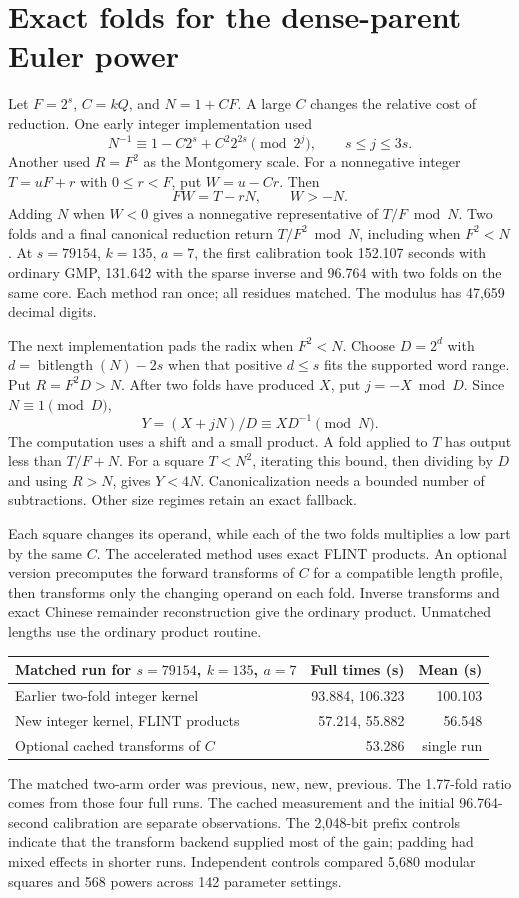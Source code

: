 \documentclass[11pt,a4paper,oneside,openany]{report}
\begin{document}
\section{Exact folds for the dense-parent Euler power}
Let $F=2^s$, $C=kQ$, and $N=1+CF$. A large $C$ changes the relative cost of reduction. One early integer implementation used
\[
 N^{-1}\equiv 1-C2^s+C^2 2^{2s}\pmod {2^j},\qquad s\le j\le3s .
\]
Another used $R=F^2$ as the Montgomery scale. For a nonnegative integer $T=uF+r$ with $0\le r<F$, put $W=u-Cr$. Then
\[
 FW=T-rN,\qquad W>-N.
\]
Adding $N$ when $W<0$ gives a nonnegative representative of $T/F\bmod N$. Two folds and a final canonical reduction return $T/F^2\bmod N$, including when $F^2<N$. At $s=79154$, $k=135$, $a=7$, the first calibration took 152.107 seconds with ordinary GMP, 131.642 with the sparse inverse and 96.764 with two folds on the same core. Each method ran once; all residues matched. The modulus has 47,659 decimal digits.

The next implementation pads the radix when $F^2<N$. Choose $D=2^d$ with $d=\operatorname{bitlength}(N)-2s$ when that positive $d\le s$ fits the supported word range. Put $R=F^2D>N$. After two folds have produced $X$, put $j=-X\bmod D$. Since $N\equiv1\pmod D$,
\[
  Y=(X+jN)/D\equiv XD^{-1}\pmod N.
\]
The computation uses a shift and a small product. A fold applied to $T$ has output less than $T/F+N$. For a square $T<N^2$, iterating this bound, then dividing by $D$ and using $R>N$, gives $Y<4N$. Canonicalization needs a bounded number of subtractions. Other size regimes retain an exact fallback.

Each square changes its operand, while each of the two folds multiplies a low part by the same $C$. The accelerated method uses exact FLINT products. An optional version precomputes the forward transforms of $C$ for a compatible length profile, then transforms only the changing operand on each fold. Inverse transforms and exact Chinese remainder reconstruction give the ordinary product. Unmatched lengths use the ordinary product routine.
\begin{center}\small
\begin{tabular}{@{}lrr@{}}\toprule
Matched run for $s=79154$, $k=135$, $a=7$ & Full times (s) & Mean (s)\\\midrule
Earlier two-fold integer kernel &93.884, 106.323&100.103\\
New integer kernel, FLINT products &57.214, 55.882&56.548\\
Optional cached transforms of $C$ &53.286&single run\\\bottomrule
\end{tabular}
\end{center}
The matched two-arm order was previous, new, new, previous. The 1.77-fold ratio comes from those four full runs. The cached measurement and the initial 96.764-second calibration are separate observations. The 2,048-bit prefix controls indicate that the transform backend supplied most of the gain; padding had mixed effects in shorter runs. Independent controls compared 5,680 modular squares and 568 powers across 142 parameter settings.
\end{document}
